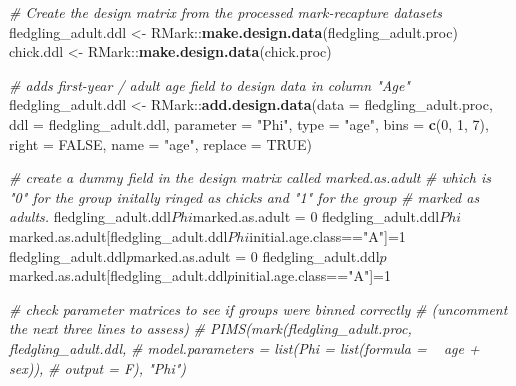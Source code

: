 \documentclass[]{article}
\newenvironment{Shaded}{\begin{snugshade}}{\end{snugshade}}
\newcommand{\KeywordTok}[1]{\textcolor[rgb]{0.13,0.29,0.53}{\textbf{{#1}}}}
\newcommand{\DataTypeTok}[1]{\textcolor[rgb]{0.13,0.29,0.53}{{#1}}}
\newcommand{\DecValTok}[1]{\textcolor[rgb]{0.00,0.00,0.81}{{#1}}}
\newcommand{\StringTok}[1]{\textcolor[rgb]{0.31,0.60,0.02}{{#1}}}
\newcommand{\CommentTok}[1]{\textcolor[rgb]{0.56,0.35,0.01}{\textit{{#1}}}}
\newcommand{\OtherTok}[1]{\textcolor[rgb]{0.56,0.35,0.01}{{#1}}}
\newcommand{\NormalTok}[1]{{#1}}
\begin{document}
\begin{Shaded}
\begin{Highlighting}[]
  \CommentTok{# Create the design matrix from the processed mark-recapture datasets}
  \NormalTok{fledgling_adult.ddl <-}\StringTok{ }\NormalTok{RMark::}\KeywordTok{make.design.data}\NormalTok{(fledgling_adult.proc)}
  \NormalTok{chick.ddl <-}\StringTok{ }\NormalTok{RMark::}\KeywordTok{make.design.data}\NormalTok{(chick.proc)}
  
  \CommentTok{# adds first-year / adult age field to design data in column "Age"}
  \NormalTok{fledgling_adult.ddl <-}\StringTok{ }\NormalTok{RMark::}\KeywordTok{add.design.data}\NormalTok{(}\DataTypeTok{data =} \NormalTok{fledgling_adult.proc,}
                                                \DataTypeTok{ddl =} \NormalTok{fledgling_adult.ddl, }
                                                \DataTypeTok{parameter =} \StringTok{"Phi"}\NormalTok{, }
                                                \DataTypeTok{type =} \StringTok{"age"}\NormalTok{,}
                                                \DataTypeTok{bins =} \KeywordTok{c}\NormalTok{(}\DecValTok{0}\NormalTok{, }\DecValTok{1}\NormalTok{, }\DecValTok{7}\NormalTok{), }\DataTypeTok{right =} \OtherTok{FALSE}\NormalTok{,}
                                                \DataTypeTok{name =} \StringTok{"age"}\NormalTok{, }\DataTypeTok{replace =} \OtherTok{TRUE}\NormalTok{)}
  
  \CommentTok{# create a dummy field in the design matrix called marked.as.adult }
  \CommentTok{# which is "0" for the group initally ringed as chicks and "1" for the group}
  \CommentTok{# marked as adults.}
  \NormalTok{fledgling_adult.ddl$Phi$marked.as.adult =}\StringTok{ }\DecValTok{0}
  \NormalTok{fledgling_adult.ddl$Phi$marked.as.adult[fledgling_adult.ddl$Phi$initial.age.class==}\StringTok{"A"}\NormalTok{]=}\DecValTok{1} 
  \NormalTok{fledgling_adult.ddl$p$marked.as.adult =}\StringTok{ }\DecValTok{0}
  \NormalTok{fledgling_adult.ddl$p$marked.as.adult[fledgling_adult.ddl$p$initial.age.class==}\StringTok{"A"}\NormalTok{]=}\DecValTok{1}
  
  \CommentTok{# check parameter matrices to see if groups were binned correctly }
  \CommentTok{# (uncomment the next three lines to assess)}
  \CommentTok{# PIMS(mark(fledgling_adult.proc, fledgling_adult.ddl,}
  \CommentTok{#           model.parameters = list(Phi = list(formula = ~ age + sex)), }
  \CommentTok{#           output = F), "Phi")}
   

\end{Highlighting}
\end{Shaded}
\end{document}
